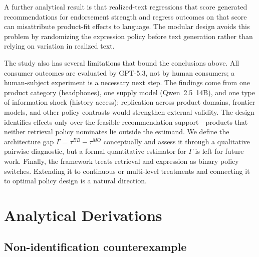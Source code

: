 \documentclass[11pt]{article}
\begin{document}
A further analytical result is that realized-text regressions that score generated recommendations for endorsement strength and regress outcomes on that score can misattribute product-fit effects to language. The modular design avoids this problem by randomizing the expression policy before text generation rather than relying on variation in realized text.

The study also has several limitations that bound the conclusions above. All consumer outcomes are evaluated by GPT-5.3, not by human consumers; a human-subject experiment is a necessary next step. The findings come from one product category (headphones), one supply model (Qwen~2.5~14B), and one type of information shock (history access); replication across product domains, frontier models, and other policy contrasts would strengthen external validity. The design identifies effects only over the feasible recommendation support---products that neither retrieval policy nominates lie outside the estimand. We define the architecture gap $\Gamma = \tau^{BB} - \tau^{MO}$ conceptually and assess it through a qualitative pairwise diagnostic, but a formal quantitative estimator for $\Gamma$ is left for future work. Finally, the framework treats retrieval and expression as binary policy switches. Extending it to continuous or multi-level treatments and connecting it to optimal policy design is a natural direction.


\bigskip



\newpage

\appendix

\section{Analytical Derivations}\label{section:proofs}

\subsection{Non-identification counterexample}\label{section:proof-nonid}
\end{document}

